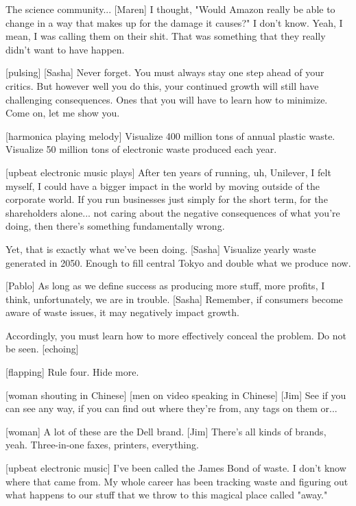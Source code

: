 \documentclass[a4paper]{article}
\begin{document}
	
	
	The science community...
	[Maren] I thought, "Would Amazon really be able to change in a way that makes up for the damage it causes?"
	I don't know.
	Yeah, I mean, I was calling them on their shit.
	That was something that they really didn't want to have happen.
	
	
	[pulsing]
	[Sasha] Never forget.
	You must always stay one step ahead of your critics.
	But however well you do this, your continued growth will still have challenging consequences.
	Ones that you will have to learn how to minimize.
	Come on, let me show you.
	
	
	
	[harmonica playing melody]
	Visualize 400 million tons of annual plastic waste.
	Visualize 50 million tons of electronic waste produced each year.
	
	
	[upbeat electronic music plays]
	After ten years of running, uh, Unilever, I felt myself, I could have a bigger impact in the world by moving outside of the corporate world.
	If you run businesses just simply for the short term, for the shareholders alone... not caring about the negative consequences of what you're doing, then there's something fundamentally wrong.
	
	
	
	Yet, that is exactly what we've been doing.
	[Sasha] Visualize yearly waste generated in 2050.
	Enough to fill central Tokyo and double what we produce now.
	
	
	[Pablo] As long as we define success as producing more stuff, more profits, I think, unfortunately, we are in trouble.
	[Sasha] Remember, if consumers become aware of waste issues, it may negatively impact growth.
	
	
	
	Accordingly, you must learn how to more effectively conceal the problem.
	Do not be seen. [echoing]
	
	
	
	[flapping]
	Rule four. Hide more.
	
	
	[woman shouting in Chinese]
	[men on video speaking in Chinese]
	[Jim] See if you can see any way, if you can find out where they're from, any tags on them or...
	
	
	[woman] A lot of these are the Dell brand.
	[Jim] There's all kinds of brands, yeah.
	Three-in-one faxes, printers, everything.
	
	
	[upbeat electronic music]
	I've been called the James Bond of waste.
	I don't know where that came from.
	My whole career has been tracking waste and figuring out what happens to our stuff that we throw to this magical place called "away."
	
\end{document}
